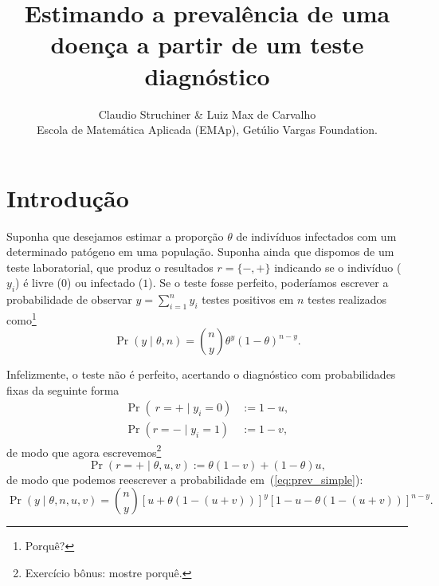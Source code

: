 \documentclass[a4paper, notitlepage, 10pt]{article}
\title{\vspace{-9ex}\centering \bf Estimando a prevalência de uma doença a partir de um teste diagnóstico}
\author{
Claudio Struchiner \& Luiz Max de Carvalho \\
Escola de Matemática Aplicada (EMAp), Get\'ulio Vargas Foundation.
}
\begin{document}
\maketitle

% 


\section*{Introdução}

Suponha que desejamos estimar a proporção $\theta$ de indivíduos infectados com um determinado patógeno em uma população.
Suponha ainda que dispomos de um teste laboratorial, que produz o resultados $r = \{-, +\}$ indicando se o indivíduo ($y_i$) é livre ($0$) ou infectado ($1$).
Se o teste fosse perfeito, poderíamos escrever a probabilidade de observar $y = \sum_{i =1}^n y_i$ testes positivos em $n$ testes realizados como\footnote{Porquê?}
\begin{equation}
\label{eq:prev_simple}
 \operatorname{Pr}\left( y \mid \theta, n \right)= \binom{n}{y} \theta^y (1-\theta)^{n-y}. 
\end{equation}


Infelizmente, o teste não é perfeito, acertando o diagnóstico com probabilidades fixas da seguinte forma
\begin{align}
 \operatorname{Pr}\left(\ r = + \mid y_i = 0 \right) &:= 1-u,\\
 \operatorname{Pr}\left( r = - \mid y_i = 1 \right) &:= 1-v,
\end{align}
de modo que agora escrevemos\footnote{Exercício bônus: mostre porquê.}
\begin{equation}
  \operatorname{Pr}\left(r = + \mid \theta, u, v \right) := \theta ( 1- v) + (1-\theta)u,
\end{equation}
de modo que podemos reescrever a probabilidade em~(\ref{eq:prev_simple}):
\begin{equation}
 \operatorname{Pr}\left(y \mid \theta, n, u, v\right) = \binom{n}{y} \left[ u + \theta ( 1- (u  + v)) \right]^{y} \left[ 1 -u - \theta (1 -(u + v))\right]^{n-y}.
\end{equation}
\end{document}
